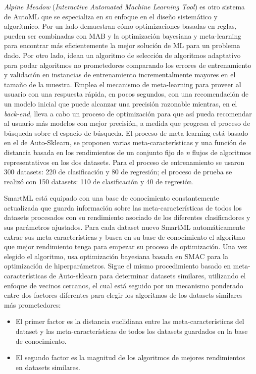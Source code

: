 \textit{Alpine Meadow} (\textit{Interactive Automated Machine Learning Tool}) \cite{shang2019democratizing} es otro sistema de AutoML que se especializa en su enfoque en el diseño sistemático y algorítmico. Por un lado demuestran cómo optimizaciones basadas en reglas, pueden ser combinadas con MAB y la optimización bayesiana y meta-learning para encontrar más eficientemente la mejor solución de ML para un problema dado. Por otro lado, idean un algoritmo de selección de algoritmos adaptativo para podar algoritmos no prometedores comparando los errores de entrenamiento y validación en instancias de entrenamiento incrementalmente mayores en el tamaño de la muestra. Emplea el mecanismo de meta-learning para proveer al usuario con una respuesta rápida, en pocos segundos, con una recomendación de un modelo inicial que puede alcanzar una precisión razonable mientras, en el \textit{back-end}, lleva a cabo un proceso de optimización para que así pueda recomendar al usuario más modelos con mejor precisión, a medida que progresa el proceso de búsqueda sobre el espacio de búsqueda. El proceso de meta-learning está basado en el de Auto-Sklearn, se proponen varias meta-características y una función de distancia basada en los rendimientos de un conjunto fijo de \textit{n} flujos de algoritmos representativos en los dos datasets. Para el proceso de entrenamiento se usaron 300 datasets: 220 de clasificación y 80 de regresión; el proceso de prueba se realizó con 150 datasets: 110 de clasificación y 40 de regresión.

SmartML \cite{maher2019smartml} está equipado con una base de conocimiento constantemente actualizada que guarda información sobre las meta-características de todos los datasets procesados con su rendimiento asociado de los diferentes clasificadores y sus parámetros ajustados. Para cada dataset nuevo SmartML automáticamente extrae sus meta-características y busca en su base de conocimiento el algoritmo que mejor rendimiento tenga para empezar su proceso de optimización. Una vez elegido el algoritmo, usa optimización bayesiana basada en SMAC para la optimización de hiperparámetros. Sigue el mismo procedimiento basado en meta-características de Auto-sklearn para determinar datasets similares, utilizando el enfoque de vecinos cercanos, el cual está seguido por un mecanismo ponderado entre dos factores diferentes para elegir los algoritmos de los datasets similares más prometedores:

\begin{itemize}
	\item El primer factor es la distancia euclidiana entre las meta-características del dataset y las meta-características de todos los datasets guardados en la base de conocimiento.
	\item El segundo factor es la magnitud de los algoritmos de mejores rendimientos en datasets similares.
\end{itemize}

